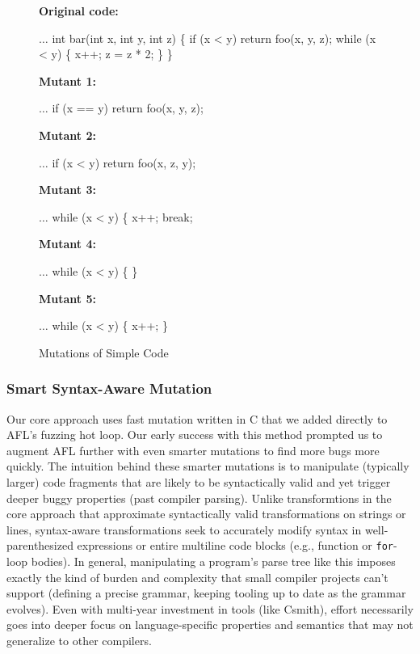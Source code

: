 \begin{figure}
  \raggedright
  {
    {\bf Original code:}
\begin{code}
$\ldots$      
 int bar(int x, int y, int z) \{
   if (x < y)
      return foo(x, y, z);
   while (x < y) \{
      x++;
      z = z * 2;
   \}
\}
\end{code}
   {\bf Mutant 1:}
\begin{code}
$\ldots$      
   if (x == y)
      return foo(x, y, z);
\end{code}
   {\bf Mutant 2:}
\begin{code}
$\ldots$      
   if (x < y)
      return foo(x, z, y);
\end{code}
   {\bf Mutant 3:}
\begin{code}
$\ldots$      
   while (x < y) \{
      x++;
      break;
    \end{code}
   {\bf Mutant 4:}
\begin{code}
$\ldots$      
   while (x < y) \{
   \}
 \end{code}
 {\bf Mutant 5:}
\begin{code}
$\ldots$      
   while (x < y) \{
     x++;
   \}
 \end{code}

}
\caption{Mutations of  Simple Code}
\label{fig:fopexample}
\end{figure}

\subsubsection{Smart Syntax-Aware Mutation}
\label{strat-syntax-aware}

\begin{sloppypar}
Our core approach uses fast mutation written in C that we added directly to
AFL's fuzzing hot loop. Our early success with this method prompted us to
augment AFL further with even smarter mutations to find more bugs more quickly.
The intuition behind these smarter mutations is to manipulate (typically
larger) code fragments that are likely to be syntactically valid and yet
trigger deeper buggy properties (past compiler parsing). Unlike transformtions
in the core approach that approximate syntactically valid transformations on
strings or lines, syntax-aware transformations seek to accurately modify syntax
in well-parenthesized expressions or entire multiline code blocks (e.g.,
function or \texttt{for}-loop bodies). In general, manipulating a program's
parse tree like this imposes exactly the kind of burden and complexity that
small compiler projects can't support (defining a precise grammar, keeping
tooling up to date as the grammar evolves). Even with multi-year investment in
tools (like Csmith), effort necessarily goes into deeper focus on
language-specific properties and semantics %
that may not generalize to other compilers.
\end{sloppypar}

